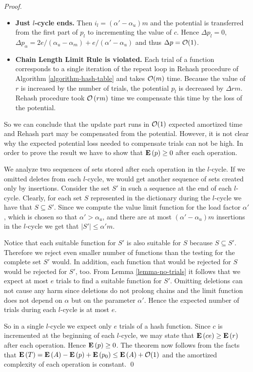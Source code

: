 \begin{proof}
\begin{itemize}
	\item \textbf{Just $l$-cycle ends.} 
Then $i_l = (\alpha' - \alpha_u)m$ and the potential is transferred from the first part of $p_l$ to incrementing the value of $c$. Hence $\Delta p_l = 0$, $\Delta p_\alpha = 2e/(\alpha_u - \alpha_m) + e/(\alpha' - \alpha_u)$ and thus $\Delta p = \mathcal{O}(1)$. 

	\item \textbf{Chain Length Limit Rule is violated.} Each trial of a function corresponds to a single iteration of the repeat loop in Rehash procedure of Algorithm \ref{algorithm-hash-table} and takes $\mathcal{O}(m)$ time. Because the value of $r$ is increased by the number of trials, the potential $p_l$ is decreased by $\Delta rm$.  Rehash procedure took $\mathcal{O}\left(rm\right)$ time we compensate this time by the loss of the potential.
\end{itemize}

So we can conclude that the update part runs in $\mathcal{O}(1)$ expected amortized time and Rehash part may be compensated from the potential. However, it is not clear why  the expected potential loss needed to compensate trials can not be high. In order to prove the result we have to show that $\mathbf{E}\left(p\right) \geq 0$ after each operation.

We analyze two sequences of sets stored after each operation in the $l$-cycle. 
If we omitted deletes from each $l$-cycle, we would get another sequence of sets created only by insertions.
Consider the set $S'$ in such a sequence at the end of each $l$-cycle. 
Clearly, for each set $S$ represented in the dictionary during the $l$-cycle we have that $S \subseteq S'$. 
Since we compute the value limit function for the load factor $\alpha'$, which is chosen so that $\alpha' > \alpha_u$, and there are at most $(\alpha' - \alpha_u)m$ insertions in the $l$-cycle we get that $|S'| \leq \alpha' m$.

Notice that each suitable function for $S'$ is also suitable for $S$ because $S \subseteq S'$. 
Therefore we reject even smaller number of functions than the testing for the complete set $S'$ would. 
In addition, each function that would be rejected for $S$ would be rejected for $S'$, too.
From Lemma \ref{lemma-no-trials} it follows that we expect at most $e$ trials to find a suitable function for $S'$. 
Omitting deletions can not cause any harm since deletions do not prolong chains and the limit function does not depend on $\alpha$ but on the parameter $\alpha'$.
Hence the expected number of trials during each $l$-cycle is at most $e$. 

So in a single $l$-cycle we expect only $e$ trials of a hash function.
Since $c$ is incremented at the beginning of each $l$-cycle, we may state that $\mathbf{E}\left(ce\right) \geq \mathbf{E}\left(r\right)$ after each operation.
Hence $\mathbf{E}\left(p\right) \geq 0$. 
The theorem now follows from the facts that $\mathbf{E}\left(T\right) = \mathbf{E}\left(A\right) - \mathbf{E}\left(p\right) + \mathbf{E}\left(p_0\right) \leq \mathbf{E}\left(A\right) + \mathcal{O}(1)$ and the amortized complexity of each operation is constant.
\qed
\end{proof}
